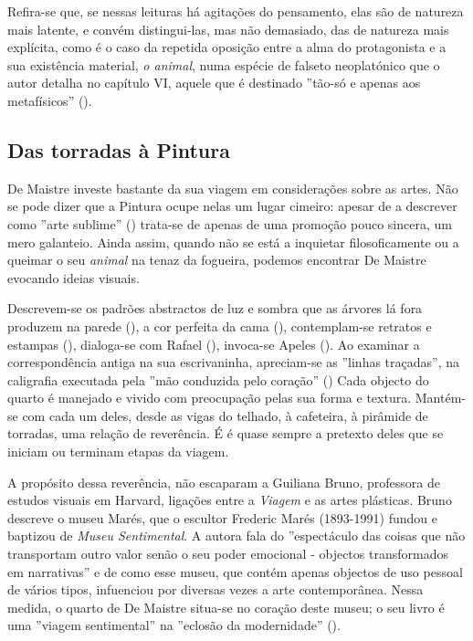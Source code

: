 \documentclass[12pt]{article}
\begin{document}
Refira-se que, se nessas leituras há agitações do pensamento, elas são
de natureza mais latente, e convém distingui-las, mas não demasiado,
das de natureza mais explícita, como é o caso da repetida oposição
entre a alma do protagonista e a sua existência material, \emph{o
  animal}, numa espécie de falseto neoplatónico que o autor detalha no
capítulo VI, aquele que é destinado ''tão-só e apenas aos
metafísicos'' (\cite[p.25]{demaistre}).

\subsection{Das torradas à Pintura}

De Maistre investe bastante da sua viagem em considerações sobre as
artes. Não se pode dizer que a Pintura ocupe nelas um lugar cimeiro:
apesar de a descrever como ''arte sublime'' (\cite[p.27]{demaistre})
trata-se de apenas de uma promoção pouco sincera, um mero
galanteio. Ainda assim, quando não se está a inquietar filosoficamente
ou a queimar o seu \emph{animal} na tenaz da fogueira, podemos
encontrar De Maistre evocando ideias visuais.

Descrevem-se os padrões abstractos de luz e sombra que as árvores lá
fora produzem na parede (\cite[p.23]{demaistre}), a cor perfeita da
cama (\cite[p.53]{demaistre}), contemplam-se retratos e estampas
(\cite[p.34]{demaistre}), dialoga-se com Rafael
(\cite[p.65]{demaistre}), invoca-se Apeles
(\cite[p.69]{demaistre}). Ao examinar a correspondência antiga na sua
escrivaninha, apreciam-se as ''linhas traçadas'', na caligrafia
executada pela ''mão conduzida pelo coração'' (\cite[p.84]{demaistre})
Cada objecto do quarto é manejado e vivido com preocupação pelas sua
forma e textura. Mantém-se com cada um deles, desde as vigas do
telhado, à cafeteira, à pirâmide de torradas, uma relação de
reverência. É é quase sempre a pretexto deles que se iniciam ou
terminam etapas da viagem.

A propósito dessa reverência, não escaparam a Guiliana Bruno,
professora de estudos visuais em Harvard, ligações entre a
\emph{Viagem} e as artes plásticas. Bruno descreve o museu Marés, que
o escultor Frederic Marés (1893-1991) fundou e baptizou de \emph{Museu
  Sentimental}. A autora fala do ''espectáculo das coisas que não
transportam outro valor senão o seu poder emocional - objectos
transformados em narrativas'' e de como esse museu, que contém apenas
objectos de uso pessoal de vários tipos, infuenciou por diversas vezes
a arte contemporânea. Nessa medida, o quarto de De Maistre situa-se no
coração deste museu; o seu livro é uma ''viagem sentimental'' na
''eclosão da modernidade'' (\cite[p.133]{bruno2002atlas}).
\end{document}
